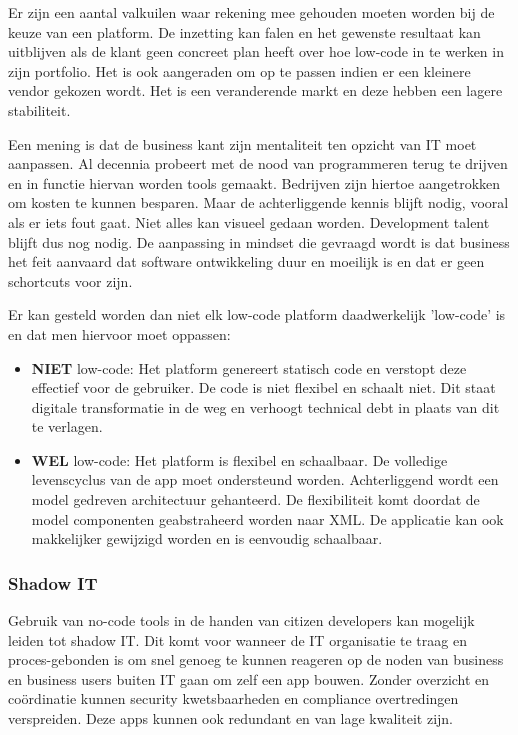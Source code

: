 Er zijn een aantal valkuilen waar rekening mee gehouden moeten worden bij de keuze van een platform. De inzetting kan falen en het gewenste resultaat kan uitblijven als de klant geen concreet plan heeft over hoe low-code in te werken in zijn portfolio. Het is ook aangeraden om op te passen indien er een kleinere vendor gekozen wordt. Het is een veranderende markt en deze hebben een lagere stabiliteit. \autocite{Richardson2016}

Een mening is dat de business kant zijn mentaliteit ten opzicht van IT moet aanpassen. Al decennia probeert met de nood van programmeren terug te drijven en in functie hiervan worden tools gemaakt. Bedrijven zijn hiertoe aangetrokken om kosten te kunnen besparen. Maar de achterliggende kennis blijft nodig, vooral als er iets fout gaat. Niet alles kan visueel gedaan worden. Development talent blijft dus nog nodig. De aanpassing in mindset die gevraagd wordt is dat business het feit aanvaard dat software ontwikkeling duur en moeilijk is en dat er geen schortcuts voor zijn. \autocite{Reselman2018}

Er kan gesteld worden dan niet elk low-code platform daadwerkelijk 'low-code' is en dat men hiervoor moet oppassen:
\begin{itemize}
    \item \textbf{NIET} low-code: Het platform genereert statisch code en verstopt deze effectief voor de gebruiker. De code is niet flexibel en schaalt niet. Dit staat digitale transformatie in de weg en verhoogt technical debt in plaats van dit te verlagen.
    \item \textbf{WEL} low-code: Het platform is flexibel en schaalbaar. De volledige levenscyclus van de app moet ondersteund worden. Achterliggend wordt een model gedreven architectuur gehanteerd. De flexibiliteit komt doordat de model componenten geabstraheerd worden naar XML. De applicatie kan ook makkelijker gewijzigd worden en is eenvoudig schaalbaar.
\end{itemize} \autocite{Shiah2018}

\subsubsection{Shadow IT}

Gebruik van no-code tools in de handen van citizen developers kan mogelijk leiden tot shadow IT. Dit komt voor wanneer de IT organisatie te traag en proces-gebonden is om snel genoeg te kunnen reageren op de noden van business en business users buiten IT gaan om zelf een app bouwen. Zonder overzicht en coördinatie kunnen security kwetsbaarheden en compliance overtredingen verspreiden. Deze apps kunnen ook redundant en van lage kwaliteit zijn. \autocite{Bloomberg2017}

